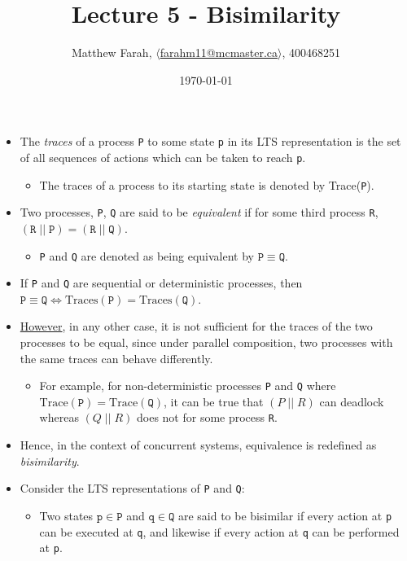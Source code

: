 \documentclass{article}
\title{Lecture 5 - Bisimilarity}
\author{Matthew Farah, \href{mailto:farahm11@mcmaster.ca}{$\langle$farahm11@mcmaster.ca$\rangle$}, 400468251}
\date{\today}
\newcounter{example}
\begin{document}
\maketitle
\pagestyle{fancy}

\fi

\begin{itemize}
	\item The \emph{traces} of a process \texttt{P} to some state \texttt{p} in its LTS representation is the set of all sequences of actions which can be taken to reach \texttt{p}.
	\begin{itemize}
		\item The traces of a process to its starting state is denoted by Trace(\texttt{P}).
	\end{itemize}
	\item Two processes, \texttt{P}, \texttt{Q} are said to be \emph{equivalent} if for some third process \texttt{R}, $(\mathtt{R} \; || \; \mathtt{P}) = (\mathtt{R} \; || \; \mathtt{Q})$.
	\begin{itemize}
		\item \texttt{P} and \texttt{Q} are denoted as being equivalent by $\mathtt{P} \equiv \mathtt{Q}$.
	\end{itemize}
	\item If \texttt{P} and \texttt{Q} are sequential or deterministic processes, then $\mathtt{P} \equiv \mathtt{Q} \iff \text{Traces}(\mathtt{P}) = \text{Traces}(\mathtt{Q})$.
	\item \underline{However}, in any other case, it is not sufficient for the traces of the two processes to be equal, since under parallel composition, two processes with the same traces can behave differently.
	\begin{itemize}
		\item For example, for non-deterministic processes \texttt{P} and \texttt{Q} where $\text{Trace}(\mathtt{P}) = \text{Trace}(\mathtt{Q})$, it can be true that $(P \; || \; R)$ can deadlock whereas $(Q \; || \; R)$ does not for some process \texttt{R}.
	\end{itemize}
	\item Hence, in the context of concurrent systems, equivalence is redefined as \emph{bisimilarity}.
	\item Consider the LTS representations of \texttt{P} and \texttt{Q}:
	\begin{itemize}
		\item Two states $\mathtt{p} \in \mathtt{P}$ and $\mathtt{q} \in \mathtt{Q}$ are said to be bisimilar if every action at \texttt{p} can be executed at \texttt{q}, and likewise if every action at \texttt{q} can be performed at \texttt{p}.

\end{itemize}
\end{itemize}
\end{document}
